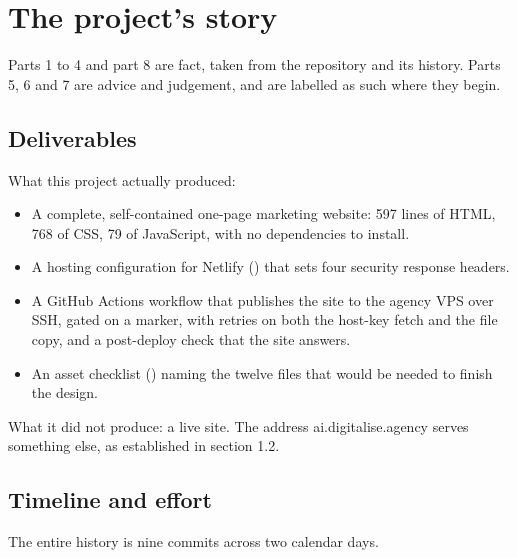 \documentclass[11pt,a4paper]{article}
\begin{document}
\section{The project's story}

Parts 1 to 4 and part 8 are fact, taken from the repository and its history. Parts
5, 6 and 7 are advice and judgement, and are labelled as such where they begin.

\subsection{Deliverables}

What this project actually produced:

\begin{itemize}
\item A complete, self-contained one-page marketing website: 597 lines of HTML,
  768 of CSS, 79 of JavaScript, with no dependencies to install.
\item A hosting configuration for Netlify () that sets four
  security response headers.
\item A GitHub Actions workflow that publishes the site to the agency VPS over
  SSH, gated on a \code{[deploy]} marker, with retries on both the host-key fetch
  and the file copy, and a post-deploy check that the site answers.
\item An asset checklist () naming the twelve files that would be
  needed to finish the design.
\end{itemize}

What it did not produce: a live site. The address ai.digitalise.agency serves
something else, as established in section 1.2.

\subsection{Timeline and effort}

The entire history is nine commits across two calendar days.
\end{document}

